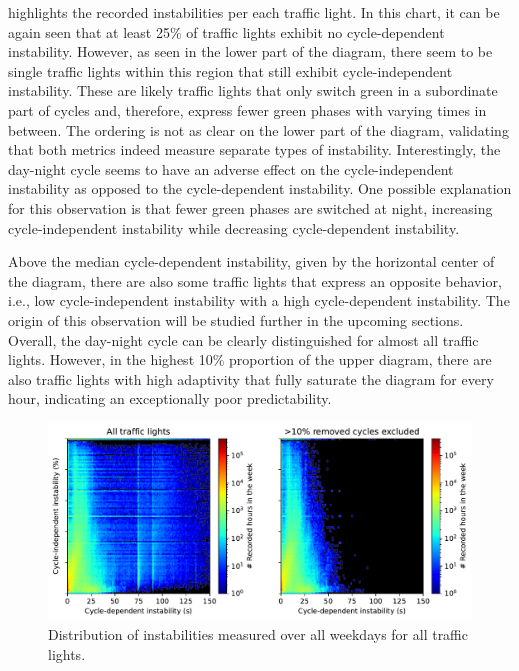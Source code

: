  highlights the recorded instabilities per each traffic light. In this chart, it can be again seen that at least 25\% of traffic lights exhibit no cycle-dependent instability. However, as seen in the lower part of the diagram, there seem to be single traffic lights within this region that still exhibit cycle-independent instability. These are likely traffic lights that only switch green in a subordinate part of cycles and, therefore, express fewer green phases with varying times in between. The ordering is not as clear on the lower part of the diagram, validating that both metrics indeed measure separate types of instability. Interestingly, the day-night cycle seems to have an adverse effect on the cycle-independent instability as opposed to the cycle-dependent instability. One possible explanation for this observation is that fewer green phases are switched at night, increasing cycle-independent instability while decreasing cycle-dependent instability.

Above the median cycle-dependent instability, given by the horizontal center of the diagram, there are also some traffic lights that express an opposite behavior, i.e., low cycle-independent instability with a high cycle-dependent instability. The origin of this observation will be studied further in the upcoming sections. Overall, the day-night cycle can be clearly distinguished for almost all traffic lights. However, in the highest 10\% proportion of the upper diagram, there are also traffic lights with high adaptivity that fully saturate the diagram for every hour, indicating an exceptionally poor predictability. 

\begin{figure}[ht]
    \centering
    \includegraphics[width=\linewidth]{images/predictability-heatmap.pdf}
    \caption{Distribution of instabilities measured over all weekdays for all traffic lights.}\label{fig:predictability-heatmap}
\end{figure}

